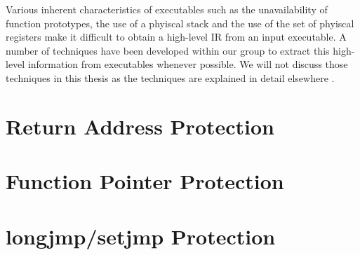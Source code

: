 Various inherent characteristics of executables such as the unavailability of function prototypes,
the use of a phyiscal stack and the use of the set of phyiscal registers make it difficult to obtain
a high-level IR from an input executable. A number of techniques have been developed within our
group to extract this high-level information from executables whenever possible. We will not discuss
those techniques in this thesis as the techniques are explained in detail elsewhere \cite{}.


\section{Return Address Protection}

\section{Function Pointer Protection}

\section{longjmp/setjmp Protection}

